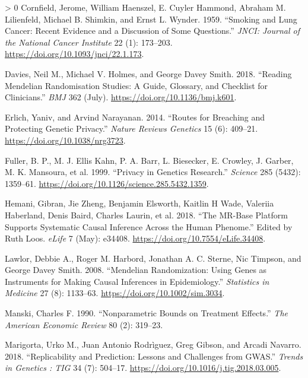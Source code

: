 \documentclass[
]{article}
\theoremstyle{plain}
\newlength{\cslhangindent}
\newenvironment{CSLReferences}[3] %
 {%
  \setlength{\parindent}{0pt}
  \ifodd #1 \everypar{\setlength{\hangindent}{\cslhangindent}}\ignorespaces\fi
  \ifnum #2 > 0
  \setlength{\parskip}{#2\baselineskip}
  \fi
 }%
 {}
\begin{document}
{\begin{CSLReferences}{1}{0}
\leavevmode\hypertarget{ref-cornfield_smoking_1959}{}%
Cornfield, Jerome, William Haenszel, E. Cuyler Hammond, Abraham M. Lilienfeld, Michael B. Shimkin, and Ernst L. Wynder. 1959. {``Smoking and {Lung Cancer}: {Recent Evidence} and a {Discussion} of {Some Questions}.''} \emph{JNCI: Journal of the National Cancer Institute} 22 (1): 173--203. \url{https://doi.org/10.1093/jnci/22.1.173}.

\leavevmode\hypertarget{ref-davies_reading_2018}{}%
Davies, Neil M., Michael V. Holmes, and George Davey Smith. 2018. {``Reading {Mendelian} Randomisation Studies: A Guide, Glossary, and Checklist for Clinicians.''} \emph{BMJ} 362 (July). \url{https://doi.org/10.1136/bmj.k601}.

\leavevmode\hypertarget{ref-erlich_routes_2014}{}%
Erlich, Yaniv, and Arvind Narayanan. 2014. {``Routes for Breaching and Protecting Genetic Privacy.''} \emph{Nature Reviews Genetics} 15 (6): 409--21. \url{https://doi.org/10.1038/nrg3723}.

\leavevmode\hypertarget{ref-fuller_privacy_1999}{}%
Fuller, B. P., M. J. Ellis Kahn, P. A. Barr, L. Biesecker, E. Crowley, J. Garber, M. K. Mansoura, et al. 1999. {``Privacy in {Genetics Research}.''} \emph{Science} 285 (5432): 1359--61. \url{https://doi.org/10.1126/science.285.5432.1359}.

\leavevmode\hypertarget{ref-mrbase}{}%
Hemani, Gibran, Jie Zheng, Benjamin Elsworth, Kaitlin H Wade, Valeriia Haberland, Denis Baird, Charles Laurin, et al. 2018. {``The MR-Base Platform Supports Systematic Causal Inference Across the Human Phenome.''} Edited by Ruth Loos. \emph{eLife} 7 (May): e34408. \url{https://doi.org/10.7554/eLife.34408}.

\leavevmode\hypertarget{ref-lawlor_mendelian_2008}{}%
Lawlor, Debbie A., Roger M. Harbord, Jonathan A. C. Sterne, Nic Timpson, and George Davey Smith. 2008. {``Mendelian Randomization: Using Genes as Instruments for Making Causal Inferences in Epidemiology.''} \emph{Statistics in Medicine} 27 (8): 1133--63. \url{https://doi.org/10.1002/sim.3034}.

\leavevmode\hypertarget{ref-manski_nonparametric_1990}{}%
Manski, Charles F. 1990. {``Nonparametric {Bounds} on {Treatment Effects}.''} \emph{The American Economic Review} 80 (2): 319--23.

\leavevmode\hypertarget{ref-marigorta_replicability_2018}{}%
Marigorta, Urko M., Juan Antonio Rodrìguez, Greg Gibson, and Arcadi Navarro. 2018. {``Replicability and {Prediction}: Lessons and Challenges from {GWAS}.''} \emph{Trends in Genetics : TIG} 34 (7): 504--17. \url{https://doi.org/10.1016/j.tig.2018.03.005}.


\end{CSLReferences}}
\end{document}
